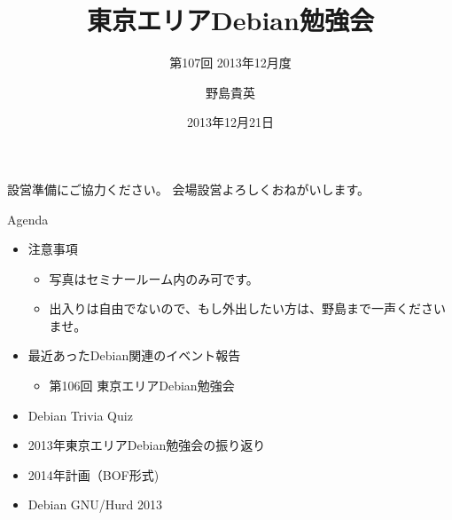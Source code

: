 \title{東京エリアDebian勉強会}
\subtitle{第107回 2013年12月度}
\author{野島貴英}
\date{2013年12月21日}



\begin{frame}
\titlepage{}
\end{frame}

\begin{frame}{設営準備にご協力ください。}
会場設営よろしくおねがいします。
\end{frame}

\begin{frame}{Agenda}
 \begin{minipage}[t]{0.45\hsize}
  \begin{itemize}
   \item 注意事項
	 \begin{itemize}
	  \item 写真はセミナールーム内のみ可です。
          \item 出入りは自由でないので、もし外出したい方は、野島まで一声くださいませ。
	 \end{itemize}
   \item 最近あったDebian関連のイベント報告
	 \begin{itemize}
	  \item 第106回 東京エリアDebian勉強会
	 \end{itemize}
  \end{itemize}
 \end{minipage} 
 \begin{minipage}[t]{0.45\hsize}
  \begin{itemize}
   \item Debian Trivia Quiz
   \item 2013年東京エリアDebian勉強会の振り返り
   \item 2014年計画（BOF形式)
   \item Debian GNU/Hurd 2013
  \end{itemize}
 \end{minipage}
\end{frame}

